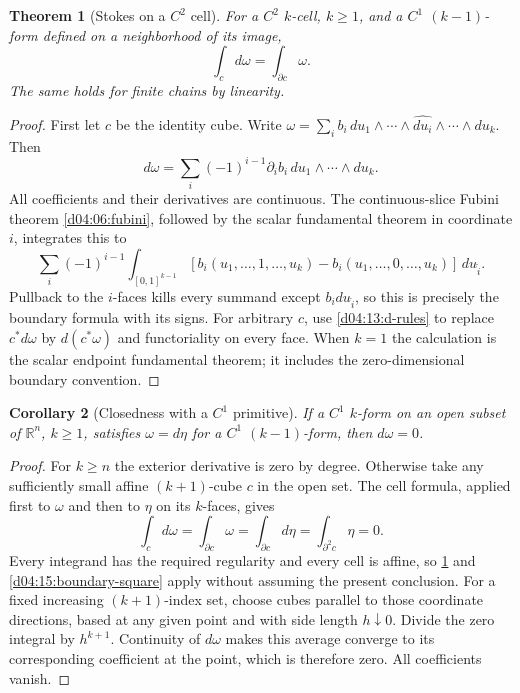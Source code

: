 \documentclass[11pt,oneside,openany]{book}
\newtheorem{theorem}{Theorem}[chapter]
\newtheorem{corollary}[theorem]{Corollary}
\theoremstyle{definition}
\theoremstyle{remark}
\newcommand{\R}{\mathbb R}
\begin{document}
\begin{theorem}[Stokes on a $C^2$ cell]\label{d04:15:cell-stokes}
For a $C^2$ $k$-cell, $k\ge1$, and a $C^1$ $(k-1)$-form defined on a
neighborhood of its image,
\[
 \int_c d\omega=\int_{\partial c}\omega.
\]
The same holds for finite chains by linearity.
\end{theorem}
\begin{proof}
First let $c$ be the identity cube. Write
$\omega=\sum_i b_i\,du_1\wedge\cdots\wedge\widehat{du_i}
\wedge\cdots\wedge du_k$. Then
\[
 d\omega=\sum_i(-1)^{i-1}\partial_i b_i\,du_1\wedge\cdots\wedge du_k.
\]
All coefficients and their derivatives are continuous. The continuous-slice
Fubini theorem \cref{d04:06:fubini}, followed by the scalar fundamental
theorem in coordinate $i$, integrates this to
\[
 \sum_i(-1)^{i-1}\int_{[0,1]^{k-1}}
 [b_i(u_1,\ldots,1,\ldots,u_k)-b_i(u_1,\ldots,0,\ldots,u_k)]\,du_{\widehat i}.
\]
Pullback to the $i$-faces kills every summand except $b_i du_{\widehat i}$,
so this is precisely the boundary formula with its signs.
For arbitrary $c$, use \cref{d04:13:d-rules} to replace $c^*d\omega$
by $d(c^*\omega)$ and functoriality on every face. When $k=1$ the
calculation is the scalar endpoint fundamental theorem; it includes the
zero-dimensional boundary convention.
\end{proof}

\begin{corollary}[Closedness with a $C^1$ primitive]\label{d04:15:exact-closed-c1}
If a $C^1$ $k$-form on an open subset of $\R^n$, $k\ge1$, satisfies
$\omega=d\eta$ for a $C^1$ $(k-1)$-form, then $d\omega=0$.
\end{corollary}
\begin{proof}
For $k\ge n$ the exterior derivative is zero by degree. Otherwise take
any sufficiently small affine $(k+1)$-cube $c$ in the open set. The cell
formula, applied first to $\omega$ and then to $\eta$ on its $k$-faces,
gives
\[
 \int_c d\omega=\int_{\partial c}\omega
 =\int_{\partial c}d\eta=\int_{\partial^2c}\eta=0.
\]
Every integrand has the required regularity and every cell is affine, so
\cref{d04:15:cell-stokes} and \cref{d04:15:boundary-square} apply without
assuming the present conclusion. For a fixed increasing $(k+1)$-index
set, choose cubes parallel to those coordinate directions, based at any
given point and with side length $h\downarrow0$. Divide the zero integral
by $h^{k+1}$. Continuity of $d\omega$ makes this average converge to its
corresponding coefficient at the point, which is therefore zero. All
coefficients vanish.
\end{proof}
\end{document}
